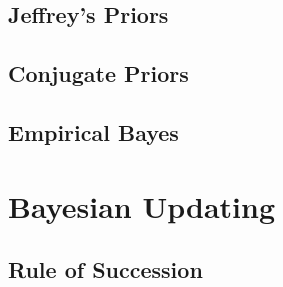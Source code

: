 \documentclass[11pt]{report} %
\begin{document}
\subsection{Jeffrey's Priors}

\subsection{Conjugate Priors}

\subsection{Empirical Bayes}

\section{Bayesian Updating}

\subsection{Rule of Succession}
\end{document}
